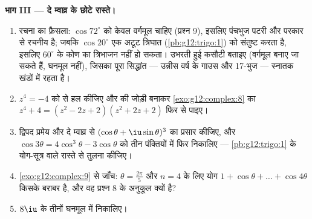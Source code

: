 \begin{problem}
\medskip
\noindent\textbf{भाग III --- दे म्वाव्र के छोटे रास्ते।}
\begin{enumerate}[resume]
  \item रचना का फ़ैसला: $\cos 72^\circ$ को केवल वर्गमूल चाहिए (प्रश्न 9), इसलिए पंचभुज
        पटरी और परकार से रचनीय है; जबकि $\cos 20^\circ$ एक अटूट त्रिघात (\cref{pb:g12:trigo:1}) को
        संतुष्ट करता है, इसलिए $60^\circ$ के कोण का त्रिभाजन नहीं हो सकता। उभरती
        हुई कसौटी बताइए (वर्गमूल बनाए जा सकते हैं, घनमूल नहीं), जिसका पूरा
        सिद्धांत --- उन्नीस वर्ष के गाउस और 17-भुज --- स्नातक खंडों में
        रहता है।
  \item $z^4 = -4$ को  से हल कीजिए और   की जोड़ी बनाकर
        \cref{exo:g12:complex:8} का  $z^4 + 4 = (z^2 - 2z + 2)(z^2 + 2z + 2)$ फिर से पाइए।
  \item द्विपद प्रमेय और दे म्वाव्र से $(\cos\theta + \iu\sin\theta)^3$ का प्रसार कीजिए, और $\cos 3\theta = 4\cos^3\theta - 3\cos\theta$ को
        तीन पंक्तियों में फिर निकालिए --- \cref{pb:g12:trigo:1} के योग-सूत्र वाले रास्ते से
        तुलना कीजिए।
  \item \cref{exo:g12:complex:9} से जाँच: $\theta = \frac{2\pi}{5}$ और $n = 4$ के लिए योग $1 + \cos\theta + \dots + \cos 4\theta$ किसके बराबर है, और वह
        प्रश्न 8 के अनुकूल क्यों है?
  \item $8\iu$ के तीनों घनमूल  में निकालिए।
\end{enumerate}


\end{problem}
